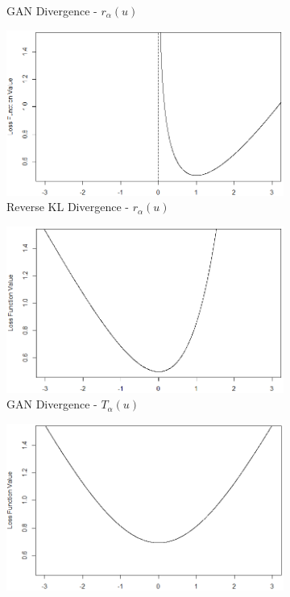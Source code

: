 \documentclass[honours,12pt]{unswthesis}
\numberwithin{equation}{section}
\theoremstyle{definition}
\begin{document}
\begin{figure}[h!]
\begin{subfigure}{0.49\textwidth}
\caption{GAN Divergence - $r_\alpha(u)$}
\end{subfigure}
\begin{subfigure}{0.49\textwidth}
\includegraphics[width=\linewidth]{KLR.png}
\caption{Reverse KL Divergence - $r_\alpha(u)$}
\end{subfigure}
\begin{subfigure}{0.49\textwidth}
\includegraphics[width=\linewidth]{ADVT.png}
\caption{GAN Divergence - $T_\alpha(u)$}
\end{subfigure}
\begin{subfigure}{0.49\textwidth}
\includegraphics[width=\linewidth]{KLT.png}

\end{subfigure}
\end{figure}
\end{document}
